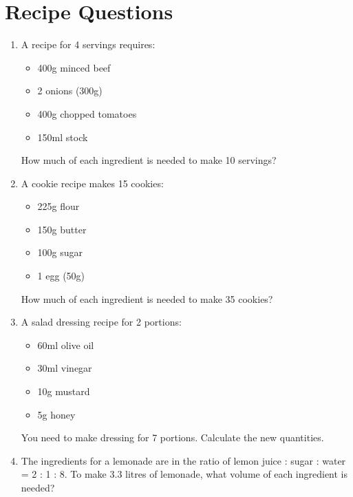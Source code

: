 \documentclass[12pt,a4paper]{article}
\begin{document}
\newpage{}

\section*{Recipe Questions}

\begin{enumerate}
\item A recipe for 4 servings requires:
    \begin{itemize}
    \item 400g minced beef
    \item 2 onions (300g)
    \item 400g chopped tomatoes
    \item 150ml stock
    \end{itemize}
    How much of each ingredient is needed to make 10 servings?

\item A cookie recipe makes 15 cookies:
    \begin{itemize}
    \item 225g flour
    \item 150g butter
    \item 100g sugar
    \item 1 egg (50g)
    \end{itemize}
    How much of each ingredient is needed to make 35 cookies?

\item A salad dressing recipe for 2 portions:
    \begin{itemize}
    \item 60ml olive oil
    \item 30ml vinegar
    \item 10g mustard
    \item 5g honey
    \end{itemize}
    You need to make dressing for 7 portions. Calculate the new quantities.

\item The ingredients for a lemonade are in the ratio of \newline lemon juice : sugar : water = 2 : 1 : 8. To make 3.3 litres of lemonade, what volume of each ingredient is needed?


\end{enumerate}
\end{document}
